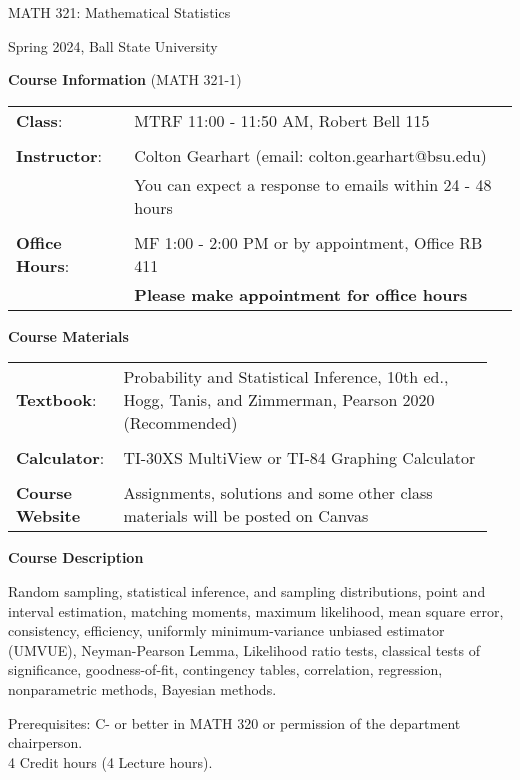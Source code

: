 \documentclass{article}
\begin{document}
\begin{center}
\Huge{MATH 321: Mathematical Statistics}

\large{Spring 2024, Ball State University}
\end{center}

\bigskip\bigskip

\textbf{\large Course Information} (MATH 321-1)\medskip

\begin{tabular}{ll}
    \textbf{Class}: & MTRF 11:00 - 11:50 AM, Robert Bell 115\\\\
    \textbf{Instructor}: & Colton Gearhart (email: colton.gearhart@bsu.edu) \\
     & You can expect a response to emails within 24 - 48 hours \\\\
    \textbf{Office Hours}: & MF 1:00 - 2:00 PM or by appointment, Office RB 411 \\
     & \textbf{Please make appointment for office hours}
\end{tabular}\bigskip

\textbf{\large Course Materials}\medskip

\begin{tabular}{p{0.2\linewidth}p{0.75\linewidth}}
    \textbf{Textbook}: & Probability and Statistical Inference, 10th ed., Hogg, Tanis, and Zimmerman, Pearson 2020 (Recommended)\\\\
    \textbf{Calculator}: & TI-30XS MultiView or TI-84 Graphing Calculator\\\\
    \textbf{Course Website} & Assignments, solutions and some other class materials will be posted on Canvas
\end{tabular}\bigskip

\textbf{\large Course Description}\medskip

Random sampling, statistical inference, and sampling distributions, point and interval estimation, matching moments, maximum likelihood, mean square error, consistency, efficiency, uniformly minimum-variance unbiased estimator (UMVUE), Neyman-Pearson Lemma, Likelihood ratio tests, classical tests of significance, goodness-of-fit, contingency tables, correlation, regression, nonparametric methods, Bayesian methods.

Prerequisites: C- or better in MATH 320 or permission of the department chairperson.\\
4 Credit hours (4 Lecture hours).\bigskip
\end{document}
